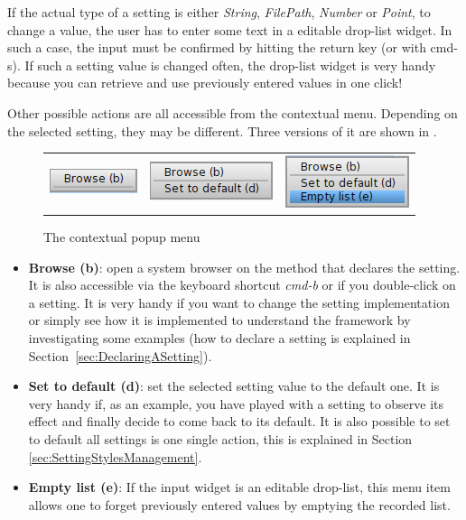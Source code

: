 \documentclass[a4paper,10pt,twoside]{book}
\begin{document}
If the actual type of a setting is either \textit{String}, \textit{FilePath}, \textit{Number} or \textit{Point},  to change a value, the user has to enter some text in a editable drop-list widget. In such a case, the input must be confirmed by hitting the return key (or with cmd-s). If such a setting value is changed often, the drop-list widget is very handy because you can retrieve and use previously entered values in one click!

Other possible actions are all accessible from the contextual menu.
Depending on the selected setting, they may be different. Three versions of it are shown in .
\begin{figure}[tbh]
\begin{center}
\begin{tabular}{ccc}
\includegraphics[scale=0.5]{popup0.png} & 
	\includegraphics[scale=0.5]{popup1.png} & 
	\includegraphics[scale=0.5]{popup2.png} \\ 
\end{tabular} 
\caption{The contextual popup menu}
\end{center}
\end{figure}
\begin{itemize}
\item \textbf{Browse (b)}: open a system browser on the method that declares the setting. It is also accessible via the keyboard shortcut \textit{cmd-b} or if you double-click on a setting. It is very handy if you want to change the setting implementation or simply see how it is implemented to understand the framework by investigating some examples (how to declare a setting is explained in Section~\ref{sec:DeclaringASetting}).
\item \textbf{Set to default (d)}: set the selected setting value to the default one. It is very handy if, as an example, you have played with a setting to observe its effect and finally decide to come back to its default. It is also possible to set to default all settings is one single action, this is explained in Section \ref{sec:SettingStylesManagement}.
\item \textbf{Empty list (e)}: If the input widget is an editable drop-list, this menu item allows one to forget previously entered values by emptying the recorded list.
\end{itemize}
\end{document}
